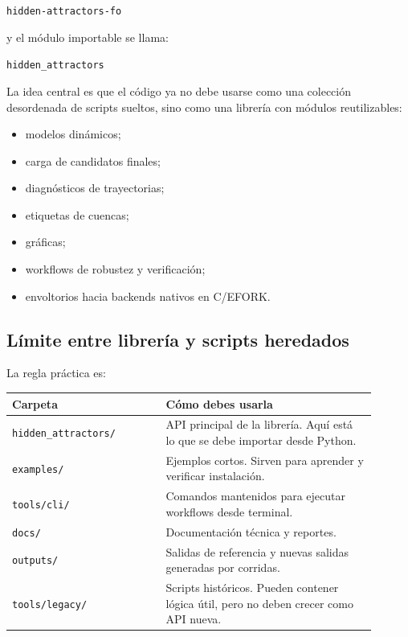 \documentclass[11pt,letterpaper]{article}
\begin{document}
\begin{center}
\texttt{hidden-attractors-fo}
\end{center}

y el módulo importable se llama:

\begin{center}
\texttt{hidden\_attractors}
\end{center}

La idea central es que el código ya no debe usarse como una colección desordenada de scripts sueltos, sino como una librería con módulos reutilizables:

\begin{itemize}
  \item modelos dinámicos;
  \item carga de candidatos finales;
  \item diagnósticos de trayectorias;
  \item etiquetas de cuencas;
  \item gráficas;
  \item workflows de robustez y verificación;
  \item envoltorios hacia backends nativos en C/EFORK.
\end{itemize}

\subsection{Límite entre librería y scripts heredados}

La regla práctica es:

\begin{center}
\begin{tabular}{p{0.38\linewidth}p{0.52\linewidth}}
\toprule
Carpeta & Cómo debes usarla \\
\midrule
\texttt{hidden\_attractors/} & API principal de la librería. Aquí está lo que se debe importar desde Python. \\
\texttt{examples/} & Ejemplos cortos. Sirven para aprender y verificar instalación. \\
\texttt{tools/cli/} & Comandos mantenidos para ejecutar workflows desde terminal. \\
\texttt{docs/} & Documentación técnica y reportes. \\
\texttt{outputs/} & Salidas de referencia y nuevas salidas generadas por corridas. \\
\texttt{tools/legacy/} & Scripts históricos. Pueden contener lógica útil, pero no deben crecer como API nueva. \\
\bottomrule
\end{tabular}
\end{center}
\end{document}
